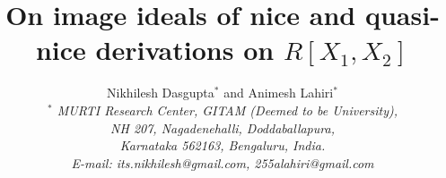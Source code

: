 \documentclass[a4paper,12pt]{article}
\author{Nikhilesh Dasgupta$^{*}$ and Animesh Lahiri$^{*}$\\
	{\small{\it $^{*}$  MURTI Research Center, GITAM (Deemed to be University),}}\\
	{\small{\it NH 207, Nagadenehalli, Doddaballapura, }}\\
	{\small{\it Karnataka 562163, Bengaluru, India.}}\\
	{\small{\it E-mail: its.nikhilesh@gmail.com, 255alahiri@gmail.com }}}
\title{\bf On image ideals of nice and quasi-nice derivations on $R[X_1,X_2]$}
\begin{document}
\date{}
\maketitle

\abstract{\noindent
	
	
	
	
	
	
	
	
	
	
	
}
\end{document}
